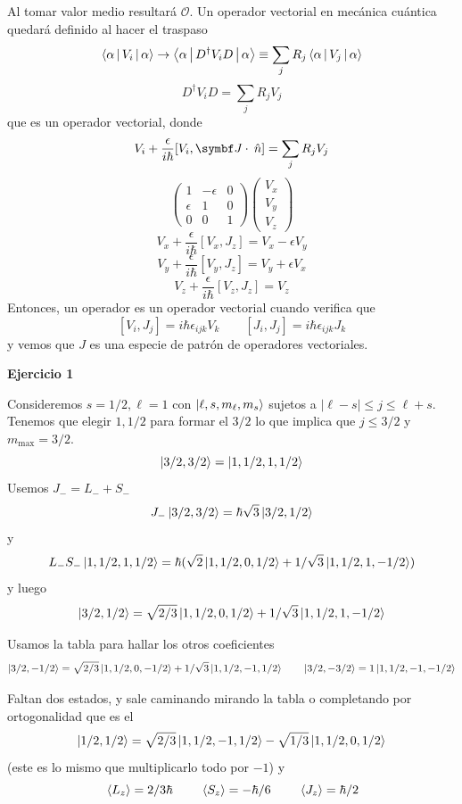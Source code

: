 \documentclass[10pt,oneside]{CBFT_book}
\begin{document}
Al tomar valor medio resultará $\mathcal{O}$. Un operador vectorial en mecánica cuántica quedará definido
al hacer el traspaso
\[
	\Braket{\alpha|V_i|\alpha} \to \Braket{\alpha| D^\dagger V_i D |\alpha} \equiv \sum_j R_j \Braket{\alpha|V_j|\alpha}
\]
\[
	D^\dagger V_i D = \sum_j R_j V_j
\]
que es un operador vectorial, donde
\[
	V_i + \frac{\epsilon}{i\hbar} [V_i, \vb J \cdot \nver ] = \sum_j R_j V_j
\]
\[
	\begin{pmatrix}
		1 	&	-\epsilon	&	0 \\
		\epsilon &	1	&	0 \\
		0 	&	0	&	1 
	\end{pmatrix}
	\begin{pmatrix}
		V_x \\
		V_y \\
		V_z
	\end{pmatrix}
\]
\[
	V_x + \frac{\epsilon}{i\hbar} [ V_x, J_z ] = V_x - \epsilon V_y
\]
\[
	V_y + \frac{\epsilon}{i\hbar} [ V_y, J_z ] = V_y + \epsilon V_x
\]
\[
	V_z + \frac{\epsilon}{i\hbar} [ V_z, J_z ] = V_z
\]
Entonces, un operador es un operador vectorial cuando verifica que
\[
	[V_i, J_j] = i \hbar \epsilon_{ijk} V_k \qquad 
	[J_i, J_j] = i \hbar \epsilon_{ijk} J_k
\]
y vemos que $J$ es una especie de patrón de operadores vectoriales.

\begin{ejemplo}{\bf Ejercicio 1}
 
Consideremos $s=1/2, \ell=1$ con $\Ket{\ell,s,m_\ell,m_s}$ sujetos a $|\ell-s| \leq j \leq \ell + s$.
Tenemos que elegir $1,1/2$ para formar el $3/2$ lo que implica que $ j \leq 3/2$ y $m_{\text{max}}=3/2$.
\[
	\Ket{3/2, 3/2} = \Ket{1,1/2,1,1/2}
\]
Usemos $J_- = L_- + S_-$
\[
	J_- \Ket{3/2, 3/2} = \hbar \sqrt{3} \Ket{3/2,1/2}
\]
y
\[
	L_- S_- \Ket{1,1/2,1,1/2} = \hbar ( \sqrt{2} \Ket{1,1/2,0,1/2} + 1/\sqrt{3} \Ket{1,1/2,1,-1/2} )
\]
y luego
\[
	\Ket{3/2, 1/2} = \sqrt{2/3} \Ket{1,1/2,0,1/2} + 1/\sqrt{3} \Ket{1,1/2,1,-1/2}
\]

Usamos la tabla para hallar los otros coeficientes
\[
	\Ket{3/2, -1/2} = \sqrt{2/3} \Ket{1,1/2,0,-1/2} + 1/\sqrt{3} \Ket{1,1/2,-1,1/2}
	\qquad 
	\Ket{3/2, -3/2} = 1 \Ket{1,1/2,-1,-1/2}
\]

Faltan dos estados, y sale caminando mirando la tabla o completando por ortogonalidad que es el
\[
	\Ket{1/2, 1/2} = \sqrt{2/3} \Ket{1,1/2,-1,1/2} - \sqrt{1/3} \Ket{1,1/2,0,1/2}
\]
(este es lo mismo que multiplicarlo todo por $-1$) y
\[
	\:\left\langle L_z \right\rangle = 2/3 \hbar \qquad \:\left\langle S_z \right\rangle = -\hbar/6 \qquad \:\left\langle J_z \right\rangle = \hbar/2
\]
 
\end{ejemplo}
\end{document}
